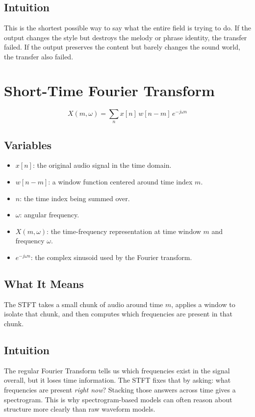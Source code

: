 \documentclass[11pt]{article}
\begin{document}
\subsection*{Intuition}
This is the shortest possible way to say what the entire field is trying to do. If the output changes the style but destroys the melody or phrase identity, the transfer failed. If the output preserves the content but barely changes the sound world, the transfer also failed.

\section{Short-Time Fourier Transform}

\begin{equation*}
X(m,\omega)=\sum_n x[n]\,w[n-m]\,e^{-j\omega n}
\end{equation*}

\subsection*{Variables}
\begin{itemize}
\item \(x[n]\): the original audio signal in the time domain.
\item \(w[n-m]\): a window function centered around time index \(m\).
\item \(n\): the time index being summed over.
\item \(\omega\): angular frequency.
\item \(X(m,\omega)\): the time-frequency representation at time window \(m\) and frequency \(\omega\).
\item \(e^{-j\omega n}\): the complex sinusoid used by the Fourier transform.
\end{itemize}

\subsection*{What It Means}
The STFT takes a small chunk of audio around time \(m\), applies a window to isolate that chunk, and then computes which frequencies are present in that chunk.

\subsection*{Intuition}
The regular Fourier Transform tells us which frequencies exist in the signal overall, but it loses time information. The STFT fixes that by asking: what frequencies are present \emph{right now}? Stacking those answers across time gives a spectrogram. This is why spectrogram-based models can often reason about structure more clearly than raw waveform models.
\end{document}
